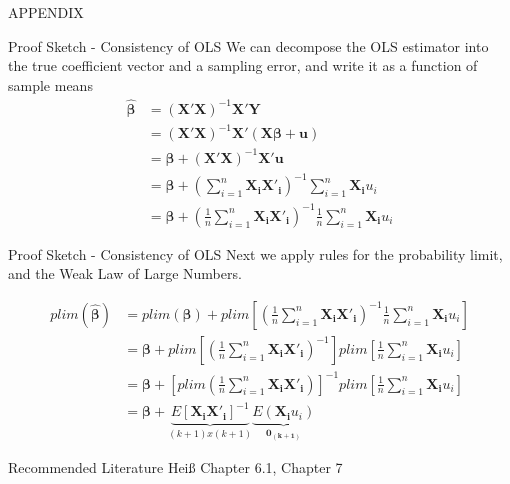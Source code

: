 \documentclass[11pt, aspectratio = 169]{beamer}
\begin{document}
\appendix
\begin{frame}
\centering\Large APPENDIX
    
\end{frame}
\begin{frame}{Proof Sketch - Consistency of OLS}
We can decompose the OLS estimator
into the true coefficient vector and a sampling error, and write it as a function of sample means
\begin{align*}
\hat{\boldsymbol{\beta}}&=(\mathbf{X}'\mathbf{X})^{-1}\mathbf{X}'\mathbf{Y} \\
                    &= (\mathbf{X}'\mathbf{X})^{-1}\mathbf{X}'(\mathbf{X}\boldsymbol{\beta}+\mathbf{u}) \\ 
                    &= \boldsymbol{\beta}+(\mathbf{X}'\mathbf{X})^{-1}\mathbf{X}'\mathbf{u} \\
                   &= \boldsymbol{\beta}+ \left(\sum_{i=1}^n\mathbf{X_i}\mathbf{X'_i}\right)^{-1}\sum_{i=1}^n\mathbf{X_i}u_i     \\
                    &= \boldsymbol{\beta}+ \left(\frac{1}{n}\sum_{i=1}^n\mathbf{X_i}\mathbf{X'_i}\right)^{-1}\frac{1}{n}\sum_{i=1}^n\mathbf{X_i}u_i     
\end{align*}

\end{frame}
\begin{frame}{Proof Sketch - Consistency of OLS}
Next we apply rules for the probability limit, and the  Weak Law of Large Numbers.

\begin{align*}
plim(\hat{\boldsymbol{\beta}})&=                  plim(\boldsymbol{\beta}) + plim\left[\left(\frac{1}{n}\sum_{i=1}^n\mathbf{X_i}\mathbf{X'_i}\right)^{-1}\frac{1}{n}\sum_{i=1}^n\mathbf{X_i}u_i\right]   \\
& = \boldsymbol{\beta} + plim\left[\left(\frac{1}{n}\sum_{i=1}^n\mathbf{X_i}\mathbf{X'_i}\right)^{-1}\right]  
plim\left[\frac{1}{n}\sum_{i=1}^n\mathbf{X_i}u_i\right]  \\
& = \boldsymbol{\beta} + \left[ plim \left( \frac{1}{n}\sum_{i=1}^n\mathbf{X_i}\mathbf{X'_i} \right)\right]^{-1}  plim \left[\frac{1}{n}\sum_{i=1}^n\mathbf{X_i}u_i\right]  \\
& = \boldsymbol{\beta} +  \underbrace{E[\mathbf{X_i}\mathbf{X'_i}]^{-1}}_{(k+1)x(k+1)}  \underbrace{E(\mathbf{X_i}u_i)}_{\mathbf{0_{(k+1)}}}
\end{align*}
\end{frame}





\begin{frame}{Recommended Literature}
Heiß Chapter 6.1, Chapter 7
\end{frame}
\end{document}
